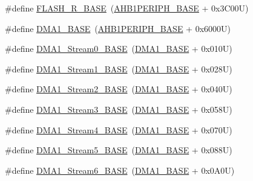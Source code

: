 \begin{DoxyCompactItemize}
\item 
\#define \hyperlink{group___peripheral__registers__structures_ga8e21f4845015730c5731763169ec0e9b}{F\+L\+A\+S\+H\+\_\+\+R\+\_\+\+B\+A\+SE}~(\hyperlink{group___peripheral__memory__map_ga811a9a4ca17f0a50354a9169541d56c4}{A\+H\+B1\+P\+E\+R\+I\+P\+H\+\_\+\+B\+A\+SE} + 0x3\+C00\+U)
\item 
\#define \hyperlink{group___peripheral__registers__structures_gab2d8a917a0e4ea99a22ac6ebf279bc72}{D\+M\+A1\+\_\+\+B\+A\+SE}~(\hyperlink{group___peripheral__memory__map_ga811a9a4ca17f0a50354a9169541d56c4}{A\+H\+B1\+P\+E\+R\+I\+P\+H\+\_\+\+B\+A\+SE} + 0x6000\+U)
\item 
\#define \hyperlink{group___peripheral__registers__structures_ga0d3c52aa35dcc68f78b704dfde57ba95}{D\+M\+A1\+\_\+\+Stream0\+\_\+\+B\+A\+SE}~(\hyperlink{group___peripheral__memory__map_gab2d8a917a0e4ea99a22ac6ebf279bc72}{D\+M\+A1\+\_\+\+B\+A\+SE} + 0x010\+U)
\item 
\#define \hyperlink{group___peripheral__registers__structures_ga5b4152cef577e37eccc9311d8bdbf3c2}{D\+M\+A1\+\_\+\+Stream1\+\_\+\+B\+A\+SE}~(\hyperlink{group___peripheral__memory__map_gab2d8a917a0e4ea99a22ac6ebf279bc72}{D\+M\+A1\+\_\+\+B\+A\+SE} + 0x028\+U)
\item 
\#define \hyperlink{group___peripheral__registers__structures_ga48a551ee91d3f07dd74347fdb35c703d}{D\+M\+A1\+\_\+\+Stream2\+\_\+\+B\+A\+SE}~(\hyperlink{group___peripheral__memory__map_gab2d8a917a0e4ea99a22ac6ebf279bc72}{D\+M\+A1\+\_\+\+B\+A\+SE} + 0x040\+U)
\item 
\#define \hyperlink{group___peripheral__registers__structures_gac51deb54ff7cfe1290dfcf517ae67127}{D\+M\+A1\+\_\+\+Stream3\+\_\+\+B\+A\+SE}~(\hyperlink{group___peripheral__memory__map_gab2d8a917a0e4ea99a22ac6ebf279bc72}{D\+M\+A1\+\_\+\+B\+A\+SE} + 0x058\+U)
\item 
\#define \hyperlink{group___peripheral__registers__structures_ga757a3c0d866c0fe68c6176156065a26b}{D\+M\+A1\+\_\+\+Stream4\+\_\+\+B\+A\+SE}~(\hyperlink{group___peripheral__memory__map_gab2d8a917a0e4ea99a22ac6ebf279bc72}{D\+M\+A1\+\_\+\+B\+A\+SE} + 0x070\+U)
\item 
\#define \hyperlink{group___peripheral__registers__structures_ga0ded7bed8969fe2e2d616e7f90eb7654}{D\+M\+A1\+\_\+\+Stream5\+\_\+\+B\+A\+SE}~(\hyperlink{group___peripheral__memory__map_gab2d8a917a0e4ea99a22ac6ebf279bc72}{D\+M\+A1\+\_\+\+B\+A\+SE} + 0x088\+U)
\item 
\#define \hyperlink{group___peripheral__registers__structures_ga58998ddc40adb6361704d6c9dad08125}{D\+M\+A1\+\_\+\+Stream6\+\_\+\+B\+A\+SE}~(\hyperlink{group___peripheral__memory__map_gab2d8a917a0e4ea99a22ac6ebf279bc72}{D\+M\+A1\+\_\+\+B\+A\+SE} + 0x0\+A0\+U)

\end{DoxyCompactItemize}
